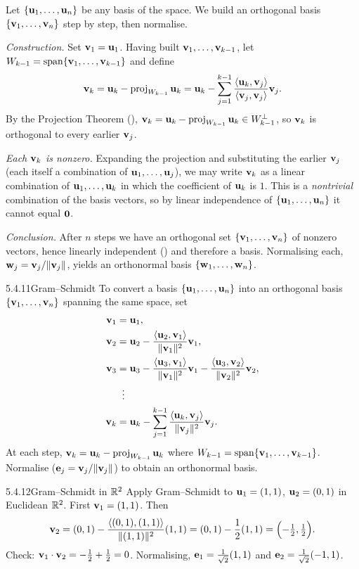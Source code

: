 \begin{prf}
Let $\{\mathbf{u}_1,\dots,\mathbf{u}_n\}$ be any basis of the space. We build an orthogonal basis $\{\mathbf{v}_1,\dots,\mathbf{v}_n\}$ step by step, then normalise.

\emph{Construction.} Set $\mathbf{v}_1=\mathbf{u}_1$. Having built $\mathbf{v}_1,\dots,\mathbf{v}_{k-1}$, let $W_{k-1}=\operatorname{span}\{\mathbf{v}_1,\dots,\mathbf{v}_{k-1}\}$ and define
\[
\mathbf{v}_k=\mathbf{u}_k-\operatorname{proj}_{W_{k-1}}\mathbf{u}_k=\mathbf{u}_k-\sum_{j=1}^{k-1}\frac{\langle \mathbf{u}_k, \mathbf{v}_j \rangle}{\langle \mathbf{v}_j, \mathbf{v}_j \rangle}\mathbf{v}_j.
\]
By the Projection Theorem (), $\mathbf{v}_k=\mathbf{u}_k-\operatorname{proj}_{W_{k-1}}\mathbf{u}_k\in W_{k-1}^\perp$, so $\mathbf{v}_k$ is orthogonal to every earlier $\mathbf{v}_j$.

\emph{Each $\mathbf{v}_k$ is nonzero.} Expanding the projection and substituting the earlier $\mathbf{v}_j$ (each itself a combination of $\mathbf{u}_1,\dots,\mathbf{u}_j$), we may write $\mathbf{v}_k$ as a linear combination of $\mathbf{u}_1,\dots,\mathbf{u}_k$ in which the coefficient of $\mathbf{u}_k$ is $1$. This is a \emph{nontrivial} combination of the basis vectors, so by linear independence of $\{\mathbf{u}_1,\dots,\mathbf{u}_n\}$ it cannot equal $\mathbf{0}$.

\emph{Conclusion.} After $n$ steps we have an orthogonal set $\{\mathbf{v}_1,\dots,\mathbf{v}_n\}$ of nonzero vectors, hence linearly independent () and therefore a basis. Normalising each, $\mathbf{w}_j=\mathbf{v}_j/\lVert \mathbf{v}_j \rVert$, yields an orthonormal basis $\{\mathbf{w}_1,\dots,\mathbf{w}_n\}$.
\end{prf}

\begin{algs}{5.4.11}{Gram--Schmidt}
To convert a basis $\{\mathbf{u}_1,\dots,\mathbf{u}_n\}$ into an orthogonal basis $\{\mathbf{v}_1,\dots,\mathbf{v}_n\}$ spanning the same space, set
\begin{align*}
\mathbf{v}_1&=\mathbf{u}_1,\\
\mathbf{v}_2&=\mathbf{u}_2-\frac{\langle \mathbf{u}_2, \mathbf{v}_1 \rangle}{\lVert \mathbf{v}_1 \rVert^2}\mathbf{v}_1,\\
\mathbf{v}_3&=\mathbf{u}_3-\frac{\langle \mathbf{u}_3, \mathbf{v}_1 \rangle}{\lVert \mathbf{v}_1 \rVert^2}\mathbf{v}_1-\frac{\langle \mathbf{u}_3, \mathbf{v}_2 \rangle}{\lVert \mathbf{v}_2 \rVert^2}\mathbf{v}_2,\\
&\;\;\vdots\\
\mathbf{v}_k&=\mathbf{u}_k-\sum_{j=1}^{k-1}\frac{\langle \mathbf{u}_k, \mathbf{v}_j \rangle}{\lVert \mathbf{v}_j \rVert^2}\mathbf{v}_j.
\end{align*}
At each step, $\mathbf{v}_k=\mathbf{u}_k-\operatorname{proj}_{W_{k-1}}\mathbf{u}_k$ where $W_{k-1}=\operatorname{span}\{\mathbf{v}_1,\dots,\mathbf{v}_{k-1}\}$. Normalise ($\mathbf{e}_j=\mathbf{v}_j/\lVert \mathbf{v}_j \rVert$) to obtain an orthonormal basis.
\end{algs}

\begin{exmp}{5.4.12}{Gram--Schmidt in $\mathbb{R}^2$}
Apply Gram--Schmidt to $\mathbf{u}_1=(1,1)$, $\mathbf{u}_2=(0,1)$ in Euclidean $\mathbb{R}^2$. First $\mathbf{v}_1=(1,1)$. Then
\[
\mathbf{v}_2=(0,1)-\frac{\langle (0,1), (1,1) \rangle}{\lVert (1,1) \rVert^2}(1,1)=(0,1)-\frac{1}{2}(1,1)=\Bigl(-\tfrac12,\tfrac12\Bigr).
\]
Check: $\mathbf{v}_1\cdot\mathbf{v}_2=-\tfrac12+\tfrac12=0$. Normalising, $\mathbf{e}_1=\tfrac{1}{\sqrt2}(1,1)$ and $\mathbf{e}_2=\tfrac{1}{\sqrt2}(-1,1)$.
\end{exmp}

